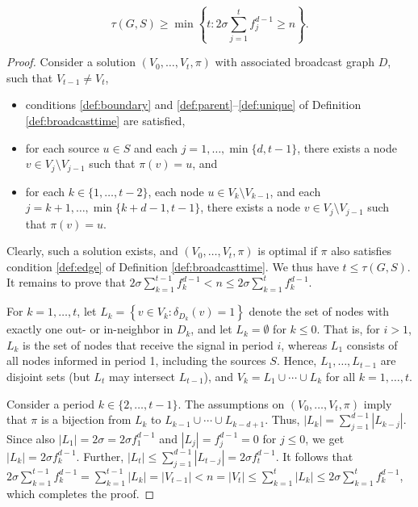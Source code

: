 \begin{proposition}
\begin{equation*}
\label{lem:lbreg1}
	\tau(G,S)\geq\min\left\{t:2\sigma\sum\limits_{j=1}^tf^{d-1}_j\geq n\right\}.
\end{equation*}
\label{prop:lbfib}
\end{proposition}
\begin{proof}

Consider a solution $\left(V_0,\ldots,V_t,\pi\right)$ with associated broadcast graph $D$, such that $V_{t-1}\neq V_t$, 
\begin{itemize}
  \item conditions \ref{def:boundary} and \ref{def:parent}--\ref{def:unique} of Definition \ref{def:broadcasttime} are satisfied,
  \item for each source $u\in S$ and each $j=1,\ldots,\min\{d,t-1\}$, there exists a node $v\in V_j\setminus V_{j-1}$ such that $\pi(v)=u$, and
  \item for each $k\in\{1,\ldots,t-2\}$, each node $u\in V_k\setminus V_{k-1}$, and each $j=k+1,\ldots,\min\{k+d-1,t-1\}$,
        there exists a node $v\in V_j\setminus V_{j-1}$ such that $\pi(v)=u$.
\end{itemize}
\noindent
Clearly, such a solution exists, and $\left(V_0,\ldots,V_t,\pi\right)$ is optimal if $\pi$ also satisfies condition \ref{def:edge} of Definition \ref{def:broadcasttime}.
We thus have $t\leq\tau(G,S)$.
It remains to prove that $2\sigma\sum_{k=1}^{t-1}f_k^{d-1}<n\leq 2\sigma\sum_{k=1}^tf_k^{d-1}$.

For $k=1,\ldots,t$, let $L_k=\left\{v\in V_k:\delta_{D_k}(v)=1\right\}$ denote the set of nodes with exactly one out- or in-neighbor in $D_k$,
and let $L_k=\emptyset$ for $k\leq 0$.
That is, for $i>1$, $L_k$ is the set of nodes that receive the signal in period $i$, whereas $L_1$ consists of all nodes informed in period 1, including the sources $S$.
Hence, $L_1,\ldots,L_{t-1}$ are disjoint sets (but $L_t$ may intersect $L_{t-1}$), and $V_k=L_1\cup\cdots\cup L_k$ for all $k=1,\ldots,t$.

Consider a period $k\in\{2,\ldots,t-1\}$.
The assumptions on $\left(V_0,\ldots,V_t,\pi\right)$ imply that $\pi$ is a bijection from $L_k$ to $L_{k-1}\cup\cdots\cup L_{k-d+1}$.
Thus, $\left|L_k\right|=\sum_{j=1}^{d-1}\left|L_{k-j}\right|$.
Since also $\left|L_1\right|=2\sigma=2\sigma f_1^{d-1}$ and $\left|L_j\right|=f_j^{d-1}=0$ for $j\leq 0$,
we get $\left|L_k\right|=2\sigma f_k^{d-1}$.
Further, $\left|L_t\right|\leq\sum_{j=1}^{d-1}\left|L_{t-j}\right|=2\sigma f_t^{d-1}$.
It follows that $2\sigma\sum_{k=1}^{t-1}f_k^{d-1}=\sum_{k=1}^{t-1}\left|L_k\right|=\left|V_{t-1}\right|<n=\left|V_t\right|\leq\sum_{k=1}^t\left|L_k\right|\leq 2\sigma\sum_{k=1}^tf_k^{d-1}$,
which completes the proof.
\end{proof}

